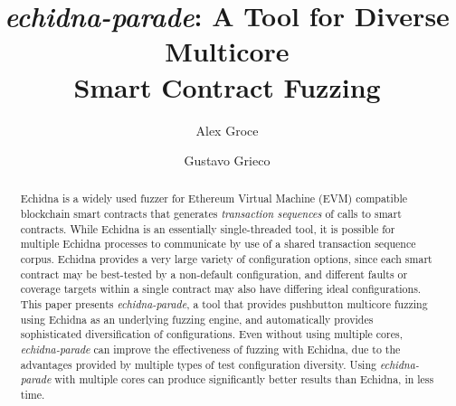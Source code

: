 \documentclass[sigconf,screen]{acmart}
\begin{document}
\title[\emph{echidna-parade}: A Tool for Diverse Multicore Smart
Contract Fuzzing]{\emph{echidna-parade}: A Tool for Diverse Multicore\\Smart Contract Fuzzing}

\author{Alex Groce}
\author{Gustavo Grieco}


\renewcommand{\shortauthors}{Groce and Grieco}

\begin{abstract}
Echidna is a widely used fuzzer for Ethereum Virtual Machine (EVM) compatible blockchain smart
contracts that generates \emph{transaction sequences} of calls to smart contracts.  While Echidna is an essentially single-threaded tool, it
is possible for multiple Echidna processes to communicate by use of a shared
transaction sequence corpus.  Echidna provides a very large variety of configuration
options, since each smart contract may be best-tested by a non-default
configuration, and different faults or coverage targets within a
single contract may also have differing ideal configurations.  This
paper presents \emph{echidna-parade}, a tool that provides pushbutton
multicore fuzzing using Echidna as an underlying fuzzing engine, and
automatically provides sophisticated diversification of
configurations.   Even without using multiple cores, \emph{echidna-parade}
can improve the effectiveness of fuzzing with Echidna,
due to the advantages provided by multiple types of test configuration
diversity.  Using \emph{echidna-parade} with multiple cores can
produce significantly better results than Echidna, in less time.
\end{abstract}
\end{document}
